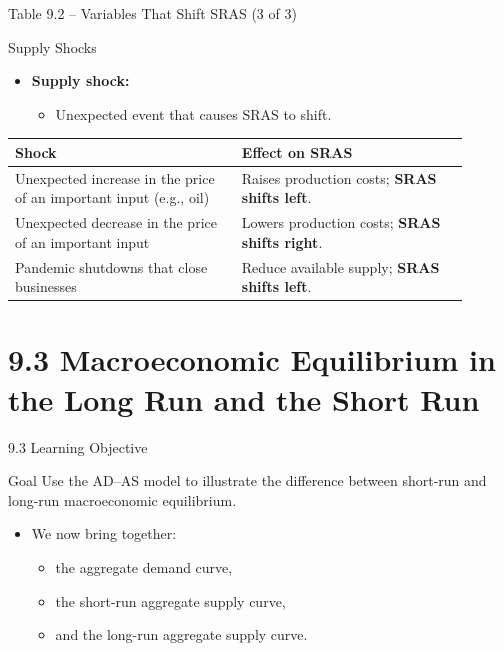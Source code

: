 \documentclass[aspectratio=169]{beamer}
\begin{document}
\begin{frame}{Table 9.2 -- Variables That Shift SRAS (3 of 3)}
\transfade
\begin{block}{Supply Shocks}
\end{block}
\begin{itemize}
  \item \textbf{Supply shock:}
  \begin{itemize}
    \item Unexpected event that causes SRAS to shift.
  \end{itemize}
\end{itemize}
\begin{table}[h]
\centering
\begin{tabular}{p{0.45\linewidth} p{0.45\linewidth}}
\toprule
\textbf{Shock} & \textbf{Effect on SRAS} \\
\midrule
Unexpected increase in the price of an important input (e.g., oil) & Raises production costs; \textbf{SRAS shifts left}. \\
Unexpected decrease in the price of an important input & Lowers production costs; \textbf{SRAS shifts right}. \\
Pandemic shutdowns that close businesses & Reduce available supply; \textbf{SRAS shifts left}. \\
\bottomrule
\end{tabular}
\end{table}
\end{frame}

\section{9.3 Macroeconomic Equilibrium in the Long Run and the Short Run}

\begin{frame}{9.3 Learning Objective}
\transfade
\begin{block}{Goal}
Use the AD--AS model to illustrate the difference between short-run and long-run macroeconomic equilibrium.
\end{block}
\begin{itemize}
  \item We now bring together:
  \begin{itemize}
    \item the aggregate demand curve,
    \item the short-run aggregate supply curve,
    \item and the long-run aggregate supply curve.
  \end{itemize}
\end{itemize}
\end{frame}
\end{document}
